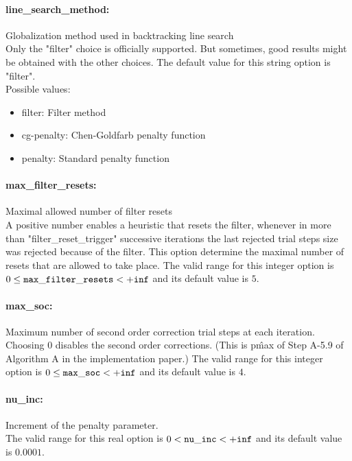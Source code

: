 \paragraph{line\_search\_method:}\label{sec:line_search_method} Globalization method used in backtracking line search $\;$ \\
 Only the "filter" choice is officially supported.
 But sometimes, good results might be obtained
with the other choices.
The default value for this string option is "filter".
\\ 
Possible values:
\begin{itemize}
   \item filter: Filter method
   \item cg-penalty: Chen-Goldfarb penalty function
   \item penalty: Standard penalty function
\end{itemize}

\paragraph{max\_filter\_resets:}\label{sec:max_filter_resets} Maximal allowed number of filter resets $\;$ \\
 A positive number enables a heuristic that resets
the filter, whenever in more than
"filter\_reset\_trigger" successive iterations
the last rejected trial steps size was rejected
because of the filter.  This option determine the
maximal number of resets that are allowed to take
place. The valid range for this integer option is
$0 \le {\tt max\_filter\_resets } <  {\tt +inf}$
and its default value is $5$.


\paragraph{max\_soc:}\label{sec:max_soc} Maximum number of second order correction trial steps at each iteration. $\;$ \\
 Choosing 0 disables the second order corrections.
(This is p\^{max} of Step A-5.9 of Algorithm A in
the implementation paper.) The valid range for this integer option is
$0 \le {\tt max\_soc } <  {\tt +inf}$
and its default value is $4$.


\paragraph{nu\_inc:}\label{sec:nu_inc} Increment of the penalty parameter. $\;$ \\
 The valid range for this real option is 
$0 <  {\tt nu\_inc } <  {\tt +inf}$
and its default value is $0.0001$.


